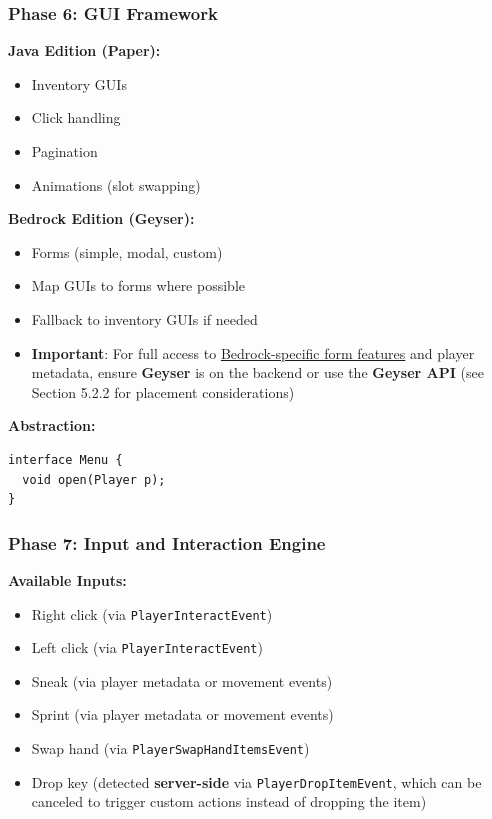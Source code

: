 \documentclass{article}
\begin{document}
\subsubsection{Phase 6: GUI Framework}

\textbf{Java Edition (Paper):}
\begin{itemize}
    \item Inventory GUIs
    \item Click handling
    \item Pagination
    \item Animations (slot swapping)
\end{itemize}

\textbf{Bedrock Edition (Geyser):}
\begin{itemize}
    \item Forms (simple, modal, custom)
    \item Map GUIs to forms where possible
    \item Fallback to inventory GUIs if needed
    \item \textbf{Important}: For full access to \uline{Bedrock-specific form features} and player metadata, ensure \textbf{Geyser} is on the backend or use the \textbf{Geyser API} (see Section 5.2.2 for placement considerations)
\end{itemize}

\textbf{Abstraction:}
\begin{verbatim}
interface Menu {
  void open(Player p);
}
\end{verbatim}

\subsubsection{Phase 7: Input and Interaction Engine}

\textbf{Available Inputs:}
\begin{itemize}
    \item Right click (via \texttt{PlayerInteractEvent})
    \item Left click (via \texttt{PlayerInteractEvent})
    \item Sneak (via player metadata or movement events)
    \item Sprint (via player metadata or movement events)
    \item Swap hand (via \texttt{PlayerSwapHandItemsEvent})
    \item Drop key (detected \textbf{server-side} via \texttt{PlayerDropItemEvent}, which can be canceled to trigger custom actions instead of dropping the item)
\end{itemize}
\end{document}

